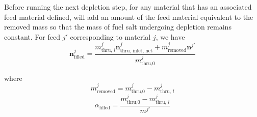 Before running the next depletion step, for any material that has an associated
feed material defined, \SaltProc will add an amount of the feed material
equivalent to the removed mass so that the mass of fuel salt undergoing depletion
remains constant.
For feed $j'$ corresponding to material $j$, we have
\begin{equation}
    \mathbf{n}^{j}_\text{filled} = \frac{m^{j}_{\text{thru, }l} \mathbf{n}^{j}_{\text{thru, inlet, net}} +  m^{j}_{\text{removed}}\mathbf{n}^{j'}}{m^{j}_{\text{thru,}0}}
\end{equation}

where 
\begin{equation}
    m^{j}_{\text{removed}} = m^{j}_{\text{thru,}0} - m^{j}_{\text{thru, } l}
\end{equation}
\begin{equation}
    \alpha_{\text{filled}} =  \frac{m^{j}_{\text{thru,}0} - m^{j}_{\text{thru, } l}}{m^{j'}}
\end{equation}
